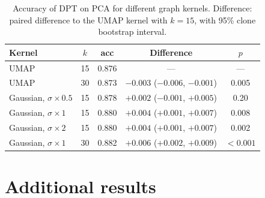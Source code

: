 \documentclass[10pt,a4paper,twocolumn]{article}
\begin{document}
\begin{table}[t]
\centering\small
\caption{Accuracy of DPT on PCA for different graph kernels. Difference: paired difference to the
UMAP kernel with $k=15$, with 95\% clone bootstrap interval.}
\label{tab:kernel}
\begin{tabular}{lcccc}
\toprule
Kernel & $k$ & acc & Difference & $p$ \\
\midrule
UMAP & 15 & 0.876 & --- & --- \\
UMAP & 30 & 0.873 & $-0.003$ ($-0.006$, $-0.001$) & 0.005 \\
Gaussian, $\sigma \times 0.5$ & 15 & 0.878 & $+0.002$ ($-0.001$, $+0.005$) & 0.20 \\
Gaussian, $\sigma \times 1$ & 15 & 0.880 & $+0.004$ ($+0.001$, $+0.007$) & 0.008 \\
Gaussian, $\sigma \times 2$ & 15 & 0.880 & $+0.004$ ($+0.001$, $+0.007$) & 0.002 \\
Gaussian, $\sigma \times 1$ & 30 & 0.882 & $+0.006$ ($+0.002$, $+0.009$) & $<0.001$ \\
\bottomrule
\end{tabular}
\end{table}


\section{Additional results}
\end{document}
